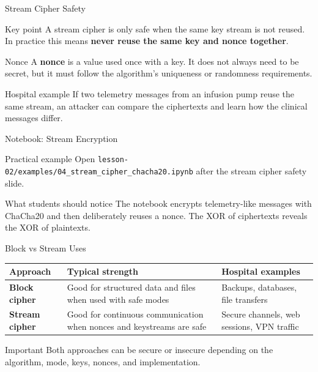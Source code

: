 \documentclass[presentation]{beamer}
\begin{document}
\begin{frame}[c]{Stream Cipher Safety}
\begin{block}{Key point}
A stream cipher is only safe when the same key stream is not reused. In practice this means
\textbf{never reuse the same key and nonce together}.
\end{block}

\begin{block}{Nonce}
A \textbf{nonce} is a value used once with a key. It does not always need to be secret, but it must
follow the algorithm's uniqueness or randomness requirements.
\end{block}

\begin{exampleblock}{Hospital example}
If two telemetry messages from an infusion pump reuse the same stream, an attacker can compare the
ciphertexts and learn how the clinical messages differ.
\end{exampleblock}

\end{frame}

\begin{frame}[c]{Notebook: Stream Encryption}
\begin{block}{Practical example}
Open \texttt{lesson-02/examples/04\_stream\_cipher\_chacha20.ipynb} after the stream cipher safety
slide.
\end{block}

\begin{exampleblock}{What students should notice}
The notebook encrypts telemetry-like messages with ChaCha20 and then deliberately reuses a nonce.
The XOR of ciphertexts reveals the XOR of plaintexts.
\end{exampleblock}
\end{frame}

\begin{frame}[c]{Block vs Stream Uses}
\begin{center}
\scriptsize
\renewcommand{\arraystretch}{1.25}
\begin{tabular}{>{\bfseries}p{} p{} p{}}
\toprule
Approach & Typical strength & Hospital examples \\
\midrule
Block cipher & Good for structured data and files when used with safe modes & Backups, databases, file transfers \\
Stream cipher & Good for continuous communication when nonces and keystreams are safe & Secure channels, web sessions, VPN traffic \\
\bottomrule
\end{tabular}
\end{center}

\begin{block}{Important}
Both approaches can be secure or insecure depending on the algorithm, mode, keys, nonces, and
implementation.
\end{block}
\end{frame}
\end{document}
